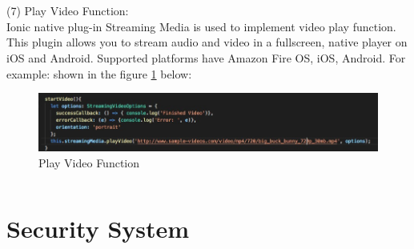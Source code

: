 \\ \\
(7) Play Video Function: \\
Ionic native plug-in Streaming Media is used to implement video play function. This plugin allows you to stream audio and video in a fullscreen, native player on iOS and Android. Supported platforms have Amazon Fire OS, iOS, Android. For example: shown in the figure
\ref{fig:6.19 cubed graph} below:
\begin{figure}[h]
	\centering
	\includegraphics[scale=0.4]{img/playVideo.png}
	\caption{Play Video Function}
	\label{fig:6.19 cubed graph}
\end{figure}
$$$$$$$$$$$$$$$$$$$$$$$$$$$$$$$$$$$$$$$$$$$$$$$$$$$$$$$$$$$$$$$$$$$$$$$$$$$$$$$$$$$$$$$$$$$$$$$$$$$$$$$$$$$$$$$$$$$$$$$$$$$$$$$$$$$$$$$$$$$$$$$$$$$$$$$$$$$$$$$$$$$$$$$$$$$$$$$$$$$$$$$$$$$$$$$$$$$$$$$$$$$$$$$$$$$$$$$$$$$$$$$$$$$$$$$$$$$$$$$$$$$$$$$$$$$$$$$$$$$$
\section{Security System}
